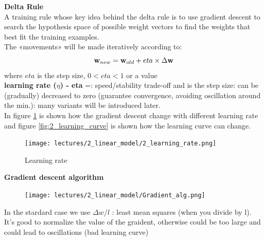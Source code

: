 \documentclass[../main.tex]{subfiles}
\begin{document}
\noindent\textbf{Delta Rule}\\
A training rule whose key idea behind the delta rule is to use gradient descent to search the hypothesis space of possible weight vectors to find the weights that best fit the training examples.\\
The «movements» will be made iteratively according to:
$$\bold{w}_{new} = \bold{w}_{old} + eta \times \Delta \bold{w}$$
where $eta$ is the step size, $0<eta<1$ or a value \\

\textbf{learning rate ($\eta$) - eta} =: speed/stability trade-off and is the step size: can be (gradually) decreased to zero (guarantee convergence, avoiding oscillation around the min.): many variants will be introduced later.\\

In figure \ref{fig:2_learning_rate} is shown how the gradient descent change with different learning rate and figure \ref{fig:2_learning_curve} is shown how the learning curve can change.

\begin{figure}[H]
    \centering
    \texttt{[image: lectures/2\_linear\_model/2\_learning\_rate.png]}
    \caption{Learning rate}
    \label{fig:2_learning_rate}
\end{figure}
\noindent\textbf{Gradient descent algorithm}
\begin{figure}[H]
    \centering
    \texttt{[image: lectures/2\_linear\_model/Gradient\_alg.png]}
    \label{fig:2_gradient_alg}
\end{figure}
\noindent In the stardard case we use $\Delta w/ l$ : least mean squares (when you divide by l). It's good to normalize the value of the graident, otherwise could be too large and could lead to oscillations (bad learning curve)\\
\end{document}
